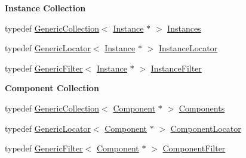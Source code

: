 \begin{Indent}\textbf{ Instance Collection}\par
\begin{DoxyCompactItemize}
\item 
typedef \mbox{\hyperlink{classHurricane_1_1GenericCollection}{Generic\+Collection}}$<$ \mbox{\hyperlink{classHurricane_1_1Instance}{Instance}} $\ast$ $>$ \mbox{\hyperlink{namespaceHurricane_ac9436b03a2926f34ad6863deae2baadc}{Instances}}
\item 
typedef \mbox{\hyperlink{classHurricane_1_1GenericLocator}{Generic\+Locator}}$<$ \mbox{\hyperlink{classHurricane_1_1Instance}{Instance}} $\ast$ $>$ \mbox{\hyperlink{namespaceHurricane_af4f7fa4dc3a2d3bdcec6f375dc5a21bc}{Instance\+Locator}}
\item 
typedef \mbox{\hyperlink{classHurricane_1_1GenericFilter}{Generic\+Filter}}$<$ \mbox{\hyperlink{classHurricane_1_1Instance}{Instance}} $\ast$ $>$ \mbox{\hyperlink{namespaceHurricane_a889ec1441e1876d9addf89dfab32e772}{Instance\+Filter}}
\end{DoxyCompactItemize}
\end{Indent}
\begin{Indent}\textbf{ Component Collection}\par
\begin{DoxyCompactItemize}
\item 
typedef \mbox{\hyperlink{classHurricane_1_1GenericCollection}{Generic\+Collection}}$<$ \mbox{\hyperlink{classHurricane_1_1Component}{Component}} $\ast$ $>$ \mbox{\hyperlink{namespaceHurricane_a7d26d99aeb5dd6d70d51bd35d2473e72}{Components}}
\item 
typedef \mbox{\hyperlink{classHurricane_1_1GenericLocator}{Generic\+Locator}}$<$ \mbox{\hyperlink{classHurricane_1_1Component}{Component}} $\ast$ $>$ \mbox{\hyperlink{namespaceHurricane_ad72b1998a4ff6e68326469dec9887f4d}{Component\+Locator}}
\item 
typedef \mbox{\hyperlink{classHurricane_1_1GenericFilter}{Generic\+Filter}}$<$ \mbox{\hyperlink{classHurricane_1_1Component}{Component}} $\ast$ $>$ \mbox{\hyperlink{namespaceHurricane_acbfacb3aada84aa054e587817f204e90}{Component\+Filter}}
\end{DoxyCompactItemize}
\end{Indent}
